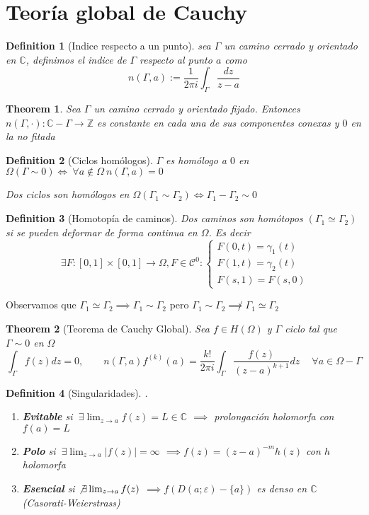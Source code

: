 \documentclass{myclass} \usepackage{verbatim}
\newtheorem*{definition}{Definition}
\newtheorem*{theorem}{Theorem}
\begin{document}
\section{Teoría global de Cauchy}
\begin{definition}[Indice respecto a un punto] sea $\Gamma$ un camino cerrado y orientado en $\mathbb{C}$, definimos el indice de $\Gamma$ respecto al punto $a$ como
  \[
  n(\Gamma, a) := \frac{1}{2\pi i} \int_{\Gamma} \frac{dz}{z-a}
  \] 
\end{definition}

\begin{theorem}
Sea $\Gamma$ un camino cerrado y orientado fijado. Entonces $n(\Gamma, \cdot): \mathbb{C}-\Gamma \to \mathbb{Z}$
es constante en cada una de sus componentes conexas y $0$ en la no fitada
\end{theorem}

\begin{definition}[Ciclos homólogos]
$\Gamma$ es homólogo a $0$ en $\Omega (\Gamma \sim 0) \iff \ \forall a \not\in \Omega \ n(\Gamma, a) = 0$ 

Dos ciclos son homólogos en $\Omega (\Gamma_1 \sim \Gamma_2) \iff \Gamma_1-\Gamma_2 \sim 0$ 
\end{definition}

\begin{definition}[Homotopía de caminos]
Dos caminos son homótopos $(\Gamma_1 \simeq \Gamma_2)$ si se pueden deformar de forma continua en $\Omega$. Es decir
\[
\ \exists F: [0, 1]\times [0, 1] \to \Omega, F\in \mathcal{C}^0 : \begin{cases}
  F(0, t) = \gamma_1(t) \\
  F(1, t) = \gamma_2(t) \\
  F(s, 1) = F(s, 0)
\end{cases}
\] 
\end{definition}

Observamos que $\Gamma_1 \simeq \Gamma_2 \implies \Gamma_1 \sim \Gamma_2$ pero $\Gamma_1 \sim \Gamma_2 \not\implies \Gamma_1 \simeq \Gamma_2$


\begin{theorem}[Teorema de Cauchy Global]
Sea $f\in H(\Omega)$ y $\Gamma$ ciclo tal que $\Gamma \sim 0$ en $\Omega$
\[
\int_\Gamma f(z)dz = 0, \qquad n(\Gamma, a)f^{(k)}(a) = \frac{k!}{2\pi i}\int_\Gamma \frac{f(z)}{(z-a)^{k+1}}dz  \quad \ \forall a\in \Omega-\Gamma
\] 
\end{theorem}

\begin{definition}[Singularidades] .
\begin{enumerate}[topsep=-6pt, itemsep=0pt]
  \item \textbf{Evitable} si $\ \exists \lim_{z\to a}f(z)=L\in \mathbb{C}$ $\implies$ prolongación holomorfa con $f(a) = L$ 
  \item \textbf{Polo} si $\ \exists \lim_{z\to a}|f(z)|=\infty$ $\implies f(z) = (z-a)^{-m}h(z)$ con $h$ holomorfa
  \item \textbf{Esencial} si $\not \exists \lim_{z\to a}f(z)$ $\implies f(D(a;\varepsilon )-\{a\})$ es denso en $\mathbb{C}$ (Casorati-Weierstrass)
\end{enumerate}
\end{definition}
\end{document}
